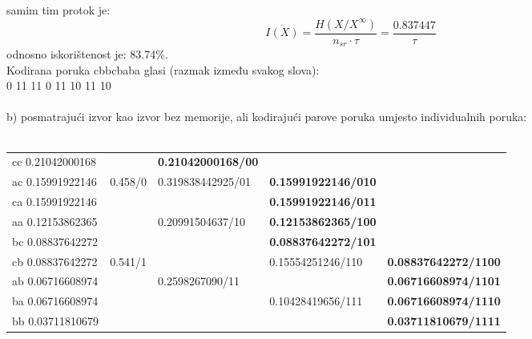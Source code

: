 \documentclass[12pt]{article}
\begin{document}
\begin{enumerate}
samim tim protok je: 
\begin{equation*}
    \overline{I(X)} = \frac{H(X/X^\infty)}{n_{sr} \cdot \tau} = \frac{0.837447}{\tau}
\end{equation*}
odnosno iskorištenost je: 83.74\%. \\
Kodirana poruka cbbcbaba glasi (razmak između svakog slova): \\
0 11 11 0 11 10 11 10
\\
\\
b) posmatrajući izvor kao izvor bez memorije, ali kodirajući parove poruka umjesto individualnih poruka:
\\
\\
\begin{tabular}{|l|l|l|ll}
\cline{1-3}
cc 0.21042000168 &         & \textbf{0.21042000168/00} &                                                 &                                                  \\ \cline{1-1} \cline{3-4}
ac 0.15991922146 & 0.458/0 & 0.319838442925/01         & \multicolumn{1}{l|}{\textbf{0.15991922146/010}} &                                                  \\ \cline{1-1} \cline{4-4}
ca 0.15991922146 &         &                           & \multicolumn{1}{l|}{\textbf{0.15991922146/011}} &                                                  \\ \cline{1-4}
aa 0.12153862365 &         & 0.20991504637/10          & \multicolumn{1}{l|}{\textbf{0.12153862365/100}} &                                                  \\ \cline{1-1} \cline{4-4}
bc 0.08837642272 &         &                           & \multicolumn{1}{l|}{\textbf{0.08837642272/101}} &                                                  \\ \cline{1-1} \cline{3-5} 
cb 0.08837642272 & 0.541/1 &                           & \multicolumn{1}{l|}{0.15554251246/110}          & \multicolumn{1}{l|}{\textbf{0.08837642272/1100}} \\ \cline{1-1} \cline{5-5} 
ab 0.06716608974 &         & 0.2598267090/11           & \multicolumn{1}{l|}{}                           & \multicolumn{1}{l|}{\textbf{0.06716608974/1101}} \\ \cline{1-1} \cline{4-5} 
ba 0.06716608974 &         &                           & \multicolumn{1}{l|}{0.10428419656/111}          & \multicolumn{1}{l|}{\textbf{0.06716608974/1110}} \\ \cline{1-1} \cline{5-5} 
bb 0.03711810679 &         &                           & \multicolumn{1}{l|}{}                           & \multicolumn{1}{l|}{\textbf{0.03711810679/1111}} \\ \hline

\end{tabular}
\end{enumerate}
\end{document}
